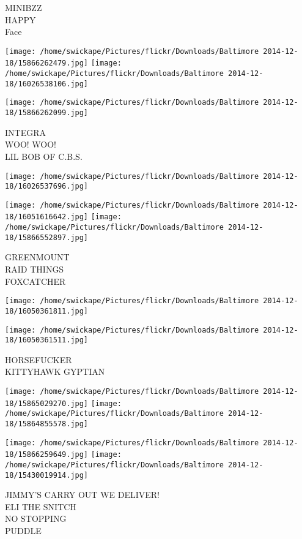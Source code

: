 \documentclass[10pt,letterpaper]{article}
\begin{document}
MINIBZZ\\
HAPPY\\
Face
\pagebreak

\texttt{[image: /home/swickape/Pictures/flickr/Downloads/Baltimore 2014-12-18/15866262479.jpg]}
\texttt{[image: /home/swickape/Pictures/flickr/Downloads/Baltimore 2014-12-18/16026538106.jpg]}

\vspace{0.25in}
\texttt{[image: /home/swickape/Pictures/flickr/Downloads/Baltimore 2014-12-18/15866262099.jpg]}

INTEGRA\\
WOO!  WOO!\\
LIL BOB OF C.B.S.
\pagebreak

\texttt{[image: /home/swickape/Pictures/flickr/Downloads/Baltimore 2014-12-18/16026537696.jpg]}

\vspace{0.25in}
\texttt{[image: /home/swickape/Pictures/flickr/Downloads/Baltimore 2014-12-18/16051616642.jpg]}
\texttt{[image: /home/swickape/Pictures/flickr/Downloads/Baltimore 2014-12-18/15866552897.jpg]}

GREENMOUNT\\
RAID THINGS\\
FOXCATCHER
\pagebreak

\texttt{[image: /home/swickape/Pictures/flickr/Downloads/Baltimore 2014-12-18/16050361811.jpg]}

\vspace{0.25in}
\texttt{[image: /home/swickape/Pictures/flickr/Downloads/Baltimore 2014-12-18/16050361511.jpg]}

HORSEFUCKER\\
KITTYHAWK GYPTIAN
\pagebreak

\texttt{[image: /home/swickape/Pictures/flickr/Downloads/Baltimore 2014-12-18/15865029270.jpg]}
\texttt{[image: /home/swickape/Pictures/flickr/Downloads/Baltimore 2014-12-18/15864855578.jpg]}

\texttt{[image: /home/swickape/Pictures/flickr/Downloads/Baltimore 2014-12-18/15866259649.jpg]}
\texttt{[image: /home/swickape/Pictures/flickr/Downloads/Baltimore 2014-12-18/15430019914.jpg]}

JIMMY'S CARRY OUT WE DELIVER!\\
ELI THE SNITCH\\
NO STOPPING\\
PUDDLE
\pagebreak
\end{document}
